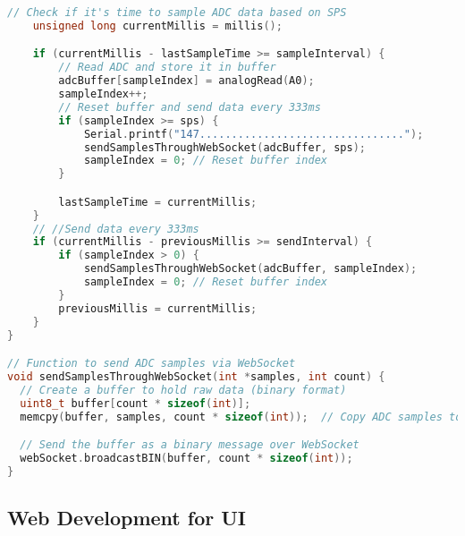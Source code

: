 \begin{lstlisting}[style=htmlcssjs, language=CPP]
    // Check if it's time to sample ADC data based on SPS
    unsigned long currentMillis = millis();

    if (currentMillis - lastSampleTime >= sampleInterval) {
        // Read ADC and store it in buffer
        adcBuffer[sampleIndex] = analogRead(A0);
        sampleIndex++;
        // Reset buffer and send data every 333ms
        if (sampleIndex >= sps) {
            Serial.printf("147................................");
            sendSamplesThroughWebSocket(adcBuffer, sps);
            sampleIndex = 0; // Reset buffer index
        }

        lastSampleTime = currentMillis;
    }
    // //Send data every 333ms
    if (currentMillis - previousMillis >= sendInterval) {
        if (sampleIndex > 0) {
            sendSamplesThroughWebSocket(adcBuffer, sampleIndex);
            sampleIndex = 0; // Reset buffer index
        }
        previousMillis = currentMillis;
    }
}

// Function to send ADC samples via WebSocket
void sendSamplesThroughWebSocket(int *samples, int count) {
  // Create a buffer to hold raw data (binary format)
  uint8_t buffer[count * sizeof(int)];
  memcpy(buffer, samples, count * sizeof(int));  // Copy ADC samples to buffer

  // Send the buffer as a binary message over WebSocket
  webSocket.broadcastBIN(buffer, count * sizeof(int));
}
\end{lstlisting}














\subsection*{Web Development for UI}
